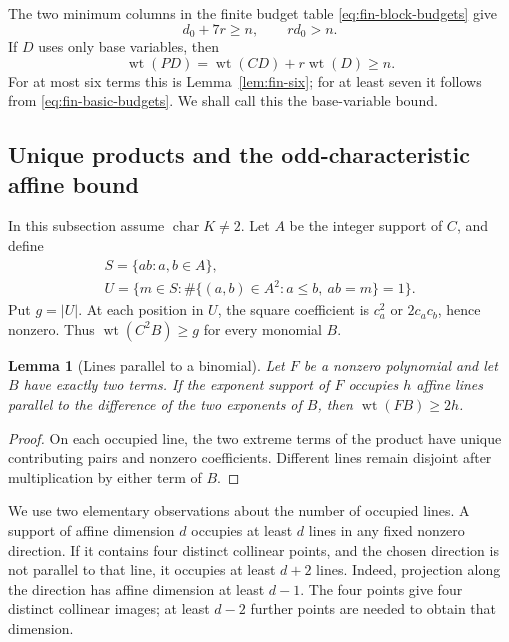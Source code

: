 \documentclass[11pt]{article}
\DeclareMathOperator{\wt}{wt}\DeclareMathOperator{\ord}{ord}
\numberwithin{equation}{section}
\newtheorem{lemma}[theorem]{Lemma}
\theoremstyle{definition}\newtheorem{definition}[theorem]{Definition}
\theoremstyle{remark}\newtheorem{remark}[theorem]{Remark}
\begin{document}
The two minimum columns in the finite budget table
\eqref{eq:fin-block-budgets} give
\begin{equation}\label{eq:fin-basic-budgets}
 d_0+7r\ge n,\qquad rd_0>n.
\end{equation}
If $D$ uses only base variables, then
\[
 \wt(PD)=\wt(CD)+r\wt(D)\ge n.
\]
For at most six terms this is Lemma~\ref{lem:fin-six}; for at least
seven it follows from \eqref{eq:fin-basic-budgets}. We shall call this
the base-variable bound.

\subsection{Unique products and the odd-characteristic affine bound}

In this subsection assume $\operatorname{char}K\ne2$. Let $A$ be the
integer support of $C$, and define
\[
 \begin{gathered}
 S=\{ab:a,b\in A\},\\
 U=\{m\in S:\#\{(a,b)\in A^2:a\le b,\ ab=m\}=1\}.
 \end{gathered}
\]
Put $g=|U|$. At each position in $U$, the square coefficient is
$c_a^2$ or $2c_ac_b$, hence nonzero. Thus $\wt(C^2B)\ge g$ for
every monomial $B$.

\begin{lemma}[Lines parallel to a binomial]\label{lem:binomial-lines}
Let $F$ be a nonzero polynomial and let $B$ have exactly two terms.
If the exponent support of $F$ occupies $h$ affine lines parallel to
the difference of the two exponents of $B$, then $\wt(FB)\ge2h$.
\end{lemma}
\begin{proof}
On each occupied line, the two extreme terms of the product have
unique contributing pairs and nonzero coefficients. Different lines
remain disjoint after multiplication by either term of $B$.
\end{proof}

We use two elementary observations about the number of occupied lines.
A support of affine dimension $d$ occupies at least $d$ lines in any
fixed nonzero direction. If it contains four distinct collinear points,
and the chosen direction is not parallel to that line, it occupies at
least $d+2$ lines. Indeed, projection along the direction has affine
dimension at least $d-1$. The four points give four distinct collinear
images; at least $d-2$ further points are needed to obtain that dimension.
\end{document}
